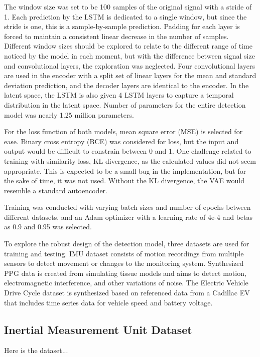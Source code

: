 \documentclass[conference]{IEEEtran}
\begin{document}
The window size was set to be 100 samples of the original signal with a stride of 1. Each prediction by the LSTM is dedicated to a single window, but since the stride is one, this is a sample-by-sample prediction. Padding for each layer is forced to maintain a consistent linear decrease in the number of samples. Different window sizes should be explored to relate to the different range of time noticed by the model in each moment, but with the difference between signal size and convolutional layers, the exploration was neglected. Four convolutional layers are used in the encoder with a split set of linear layers for the mean and standard deviation prediction, and the decoder layers are identical to the encoder. In the latent space, the LSTM is also given 4 LSTM layers to capture a temporal distribution in the latent space. Number of parameters for the entire detection model was nearly 1.25 million parameters.

For the loss function of both models, mean square error (MSE) is selected for ease. Binary cross entropy (BCE) was considered for loss, but the input and output would be difficult to constrain between 0 and 1. One challenge related to training with similarity loss, KL divergence, as the calculated values did not seem appropriate. This is expected to be a small bug in the implementation, but for the sake of time, it was not used. Without the KL divergence, the VAE would resemble a standard autoencoder.

Training was conducted with varying batch sizes and number of epochs between different datasets, and an Adam optimizer with a learning rate of 4e-4 and betas as 0.9 and 0.95 was selected. 

To explore the robust design of the detection model, three datasets are used for training and testing. IMU dataset consists of motion recordings from multiple sensors to detect movement or changes to the monitoring system. Synthesized PPG data is created from simulating tissue models and aims to detect motion, electromagnetic interference, and other variations of noise. The Electric Vehicle Drive Cycle dataset is synthesized based on referenced data from a Cadillac EV that includes time series data for vehicle speed and battery voltage.

\subsection{Inertial Measurement Unit Dataset}
Here is the dataset...
\end{document}
